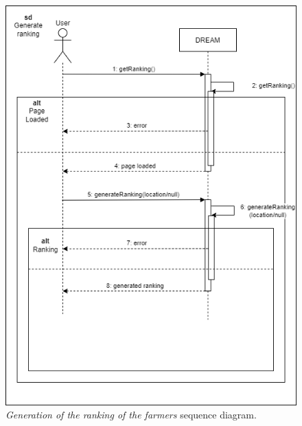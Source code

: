 \begin{figure}[H]
    \centering
    \includegraphics[width=\linewidth]{Images/Use Case/UC13.png}
    \caption{\textit{Generation of the ranking of the farmers} sequence diagram.}
\end{figure}
\newpage

